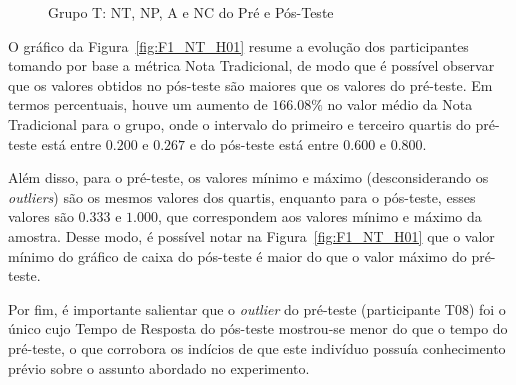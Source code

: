 \begin{figure}[htb]
{
	}
	\captionsetup{justification=centering}
	\caption{Grupo T: NT, NP, A e NC do Pré e Pós-Teste}
	\label{fig:F1_H01}
\end{figure}

O gráfico da Figura~\ref{fig:F1_NT_H01} resume a evolução dos participantes tomando por base a métrica Nota Tradicional, de modo que é possível observar que os valores obtidos no pós-teste são maiores que os valores do pré-teste. Em termos percentuais, houve um aumento de $166.08\%$ no valor médio da Nota Tradicional para o grupo, onde o intervalo do primeiro e terceiro quartis do pré-teste está entre $0.200$ e $0.267$ e do pós-teste está entre $0.600$ e $0.800$.

Além disso, para o pré-teste, os valores mínimo e máximo (desconsiderando os \textit{outliers}) são os mesmos valores dos quartis, enquanto para o pós-teste, esses valores são $0.333$ e $1.000$, que correspondem aos valores mínimo e máximo da amostra. Desse modo, é possível notar na Figura~\ref{fig:F1_NT_H01} que o valor mínimo do gráfico de caixa do pós-teste é maior do que o valor máximo do pré-teste.

Por fim, é importante salientar que o \textit{outlier} do pré-teste (participante T08) foi o único cujo Tempo de Resposta do pós-teste mostrou-se menor do que o tempo do pré-teste, o que corrobora os indícios de que este indivíduo possuía conhecimento prévio sobre o assunto abordado no experimento.

